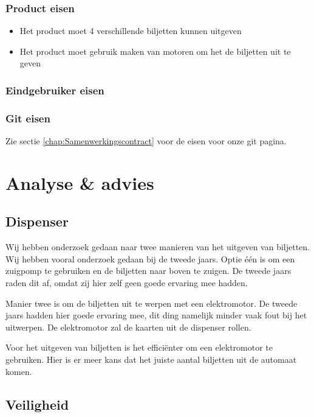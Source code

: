 \documentclass{article}
\begin{document}
\subsubsection{Product eisen}
\begin{itemize}
	\item Het product moet 4 verschillende biljetten kunnen uitgeven
	\item Het product moet gebruik maken van motoren om het de biljetten uit te geven
\end{itemize}

\subsubsection{Eindgebruiker eisen}
\subsubsection{Git eisen}

Zie sectie \ref{chap:Samenwerkingscontract} voor de eisen voor onze git pagina.



\section{Analyse \& advies}

\subsection{Dispenser}

Wij hebben onderzoek gedaan naar twee manieren van het uitgeven van biljetten.
Wij hebben vooral onderzoek gedaan bij de tweede jaars.
Optie \'e\'en is om een zuigpomp te gebruiken en de biljetten naar boven te zuigen.
De tweede jaars raden dit af, omdat zij hier zelf geen goede ervaring mee hadden.

Manier twee is om de biljetten uit te werpen met een elektromotor.
De tweede jaars hadden hier goede ervaring mee, dit ding namelijk minder vaak fout bij het uitwerpen.
De elektromotor zal de kaarten uit de dispenser rollen.

Voor het uitgeven van biljetten is het effici\"enter om een elektromotor te gebruiken.
Hier is er meer kans dat het juiste aantal biljetten uit de automaat komen.

\newpage

\subsection{Veiligheid}
\end{document}
